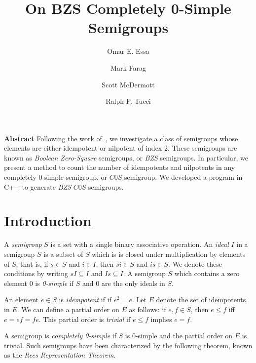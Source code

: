 \documentclass[12pt]{amsart}
\theoremstyle{plain}
\theoremstyle{definition}
\begin{document}
\title{On BZS Completely 0-Simple Semigroups}
\author{Omar E. Essa}
\address {Department of Mathematics and Computer Science, Loyola University New Orleans, N. O., LA. 70118}
\author {Mark Farag}
\address {Department of Mathematics, Fairleigh Dickinson University, Teaneck, N. J., 07666}
\author {Scott McDermott}
\address {Department of Mathematics and Computer Science, Loyola University New Orleans, N. O., LA. 70118}
\author {Ralph P. Tucci}
\address {Department of Mathematics and Computer Science, Loyola University New Orleans, N. O., LA. 70118}
\maketitle



\noindent \textbf {Abstract}
Following the work of~\cite{who}, we investigate a class of semigroups whose elements are either idempotent or nilpotent of index 2. These semigroups are known as \emph {Boolean Zero-Square} semigroups, or \emph {BZS} semigroups. In particular, we present a method to count the number of idempotents and nilpotents in any completely 0-simple semigroup, or $C0S$ semigroup. We developed a program in C++ to generate \emph {BZS} $C0S$ semigroups.


\section {Introduction} \label {I:intro}

A \emph {semigroup} $S$ is a set with a single binary associative operation. An \emph {ideal} $I$ in a semigroup $S$ is a subset of $S$ which is is closed under multiplication by elements of $S$; that is, if $s \in S$ and $i \in I$, then $si \in S$ and $is \in S$. We denote these conditions by writing $sI \subseteq I$ and $Is \subseteq I$. A semigroup $S$ which contains a zero element 0 is \emph {0-simple} if $S$ and 0 are the only ideals in $S$. 

An element $e \in S$ is \emph{idempotent} if if $e^2 = e$. Let $E$ denote the set of idempotents in $E$. We can define a partial order on $E$ as follows: if $e, f \in S$, then $e \leq f$ iff $e = ef = fe$. This partial order is \emph{trivial} if $e \leq f$ implies $e = f$.

A semigroup is \emph {completely 0-simple} if $S$ is 0-simple and the partial order on $E$ is trivial. Such semigroups have been characterized by the following theorem, known as the \emph {Rees Representation Theorem}. 
\end{document}
